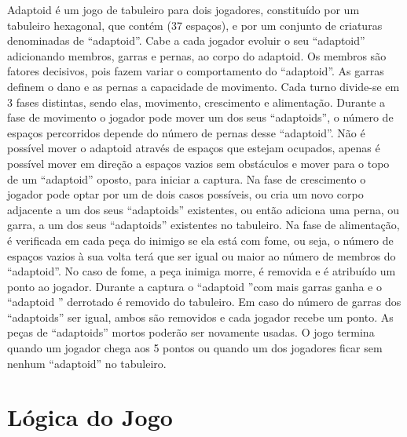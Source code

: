 \documentclass[a4paper]{article}
\begin{document}
Adaptoid é um jogo de tabuleiro para dois jogadores, constituído por um tabuleiro hexagonal, que contém (37 espaços), e por um conjunto de criaturas denominadas de “adaptoid”. Cabe a cada jogador evoluir o seu “adaptoid” adicionando membros, garras e pernas, ao corpo do adaptoid. Os membros são fatores decisivos, pois fazem variar o comportamento do “adaptoid”. As garras definem o dano e as pernas a capacidade de movimento. Cada turno divide-se em 3 fases distintas, sendo elas, movimento, crescimento e alimentação. Durante a fase de movimento o jogador pode mover um dos seus “adaptoids”, o número de espaços percorridos depende do número de pernas desse “adaptoid”. Não é possível mover o adaptoid através de espaços que estejam ocupados, apenas é possível mover em direção a espaços vazios sem obstáculos e mover para o topo de um “adaptoid” oposto, para iniciar a captura. Na fase de crescimento o jogador pode optar por um de dois casos possíveis, ou cria um novo corpo adjacente a um dos seus “adaptoids” existentes, ou então adiciona uma perna, ou garra, a um dos seus “adaptoids” existentes no tabuleiro. Na fase de alimentação, é verificada em cada peça do inimigo se ela está com fome, ou seja, o número  de espaços vazios à sua volta terá que ser igual ou maior ao número de membros do “adaptoid”. No caso de fome, a peça inimiga morre, é removida e é atribuído um ponto ao jogador. Durante a captura o “adaptoid ”com mais garras ganha e o “adaptoid ” derrotado é removido do tabuleiro. Em caso do número de garras dos “adaptoids” ser igual, ambos são removidos e cada jogador recebe um ponto. As peças de “adaptoids” mortos poderão ser novamente usadas. O jogo termina quando um jogador chega aos 5 pontos ou quando um dos jogadores ficar sem nenhum “adaptoid” no tabuleiro.


\section{Lógica do Jogo}
\end{document}
